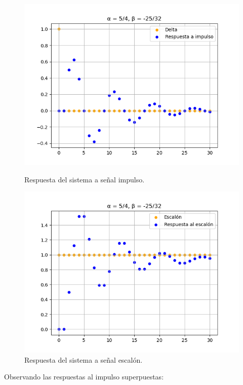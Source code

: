 \begin{figure}[H]
    \centering
    \begin{minipage}[b]{0.49\textwidth}
    \includegraphics[width=\textwidth]{images/ej9_fig3_delta.png}
    \caption{Respuesta del sistema a señal impulso.}
    \end{minipage}
    \hfill
    \begin{minipage}[b]{0.49\textwidth}
    \includegraphics[width=\textwidth]{images/ej9_fig3_step.png}
    \caption{Respuesta del sistema a señal escalón.}
    \end{minipage}
\end{figure}

Observando las respuestas al impulso superpuestas:


